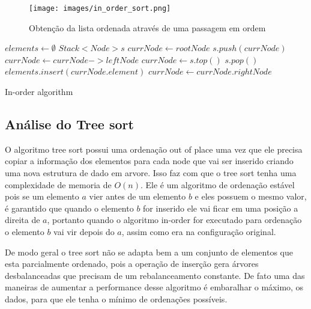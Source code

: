 \documentclass[12pt]{article}
\begin{document}
\begin{figure}[ht]
\centering
\texttt{[image: images/in\_order\_sort.png]}
\caption{Obtenção da lista ordenada através de uma passagem em ordem}
\label{fig:in_order_sort}
\end{figure}

\begin{algorithm}[H]
\begin{algorithmic}
\STATE $elements \gets \emptyset$
\STATE $Stack<Node> s$
\STATE $currNode \gets rootNode$
        \STATE $s.push(currNode)$ 
        \STATE $currNode \gets currNode->leftNode$ 
    \ENDWHILE
    \STATE $currNode \gets s.top()$ 
    \STATE $s.pop()$ 
    \STATE $elements.insert(currNode.element)$
    \STATE $currNode \gets currNode.rightNode$
\ENDWHILE

\end{algorithmic}
\caption{In-order algorithm}
\label{algo:In_order_algorithm}
\end{algorithm}

\subsection{Análise do Tree sort}

O algoritmo tree sort possui uma ordenação out of place uma vez que ele precisa copiar a informação dos elementos para cada node que vai ser inserido criando uma nova estrutura de dado em arvore. Isso faz com que o tree sort tenha uma complexidade de memoria de $O(n)$. Ele é um algoritmo de ordenação estável pois se um elemento $a$ vier antes de um elemento $b$ e eles possuem o mesmo valor, é garantido que quando o elemento $b$ for inserido ele vai ficar em uma posição a direita de $a$, portanto quando o algoritmo in-order for executado para ordenação o elemento $b$ vai vir depois do $a$, assim como era na configuração original. 

De modo geral o tree sort não se adapta bem a um conjunto de elementos que esta parcialmente ordenado, pois a operação de inserção gera árvores desbalanceadas que precisam de um rebalanceamento constante. De fato uma das maneiras de aumentar a performance desse algoritmo é embaralhar o máximo, os dados, para que ele tenha o mínimo de ordenações possíveis.
\end{document}
